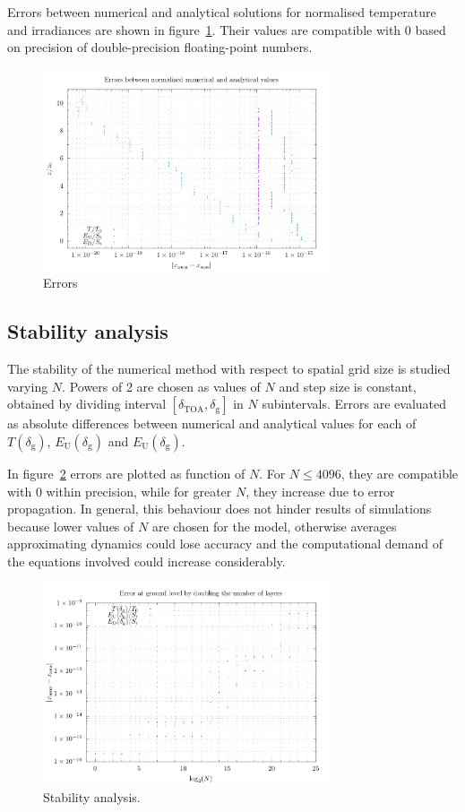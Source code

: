 \documentclass[a4paper,10pt,twocolumn,\classoptions]{article}
\newcommand{\deltaTOA}{\delta_\text{TOA}}
\begin{document}
Errors between numerical and analytical solutions for normalised temperature and irradiances are shown in figure~\ref{fig:errors}. Their values are compatible with 0 based on precision of double-precision floating-point numbers.
\begin{figure}[h]
  \centering
  \includegraphics*[keepaspectratio=true,width=0.75\textwidth]{errors}
  \caption{Errors} %
  \label{fig:errors}
\end{figure}

\subsection{Stability analysis}
The stability of the numerical method with respect to spatial grid size is studied varying $N$. Powers of 2 are chosen as values of $N$ and step size is constant, obtained by dividing interval $[\deltaTOA, \delta_\text{g}]$ in $N$ subintervals. Errors are evaluated as absolute differences between numerical and analytical values for each of $T(\delta_\text{g})$, $E_\text{U}(\delta_\text{g})$ and $E_\text{U}(\delta_\text{g})$.

In figure~\ref{fig:stability} errors are plotted as function of $N$. For $N \leq 4096$, they are compatible with 0 within precision, while for greater $N$, they increase due to error propagation. In general, this behaviour does not hinder results of simulations because lower values of $N$ are chosen for the model, otherwise averages approximating dynamics could lose accuracy and the computational demand of the equations involved could increase considerably.
\begin{figure}[h]
  \centering
  \includegraphics*[keepaspectratio=true,width=0.75\textwidth]{stability}
  \caption{Stability analysis.} %
  \label{fig:stability}
\end{figure}
\end{document}
